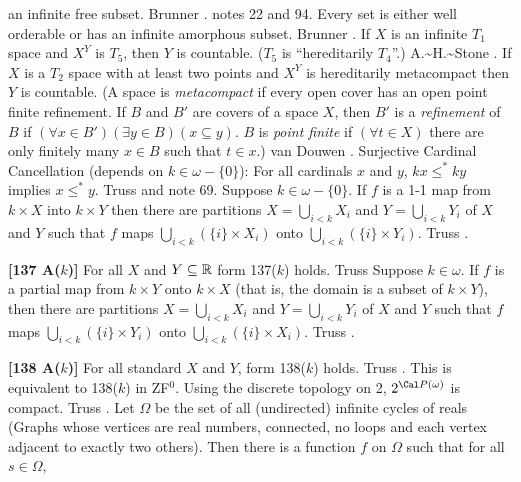 an infinite free subset.  \ac{Brunner} \cite{1989}. notes 22 and 94.
\medskip
{} Every set is either well orderable or has an
infinite amorphous subset.  \ac{Brunner} \cite{1982a}.
\medskip
{} If $X$ is an infinite $T_1$ space and $X^{Y}$
is $T_5$, then $Y$ is countable. ($T_5$ is ``hereditarily $T_4$''.)
\ac{A.~H.~Stone} \cite{1948}.
\medskip
{} If $X$ is a $T_2$ space with at least two points
and $X^{Y}$ is hereditarily metacompact then $Y$ is  countable. (A space
is {\it metacompact} if every open cover has an open point finite
refinement. If $B$ and $B'$ are covers of a space $X$, then $B'$ is a {\it
refinement} of $B$ if $(\forall x\in B')(\exists y\in B)(x\subseteq y)$.
$B$ is {\it point finite} if $(\forall t\in X)$ there are only finitely
many $x\in B$ such that $t\in x$.) van \ac{Douwen} \cite{1980}.
\medskip
{} Surjective Cardinal Cancellation (depends on
$k\in\omega-\{0\}$): For all cardinals $x$ and $y$, $kx\le^* ky$ implies
$x\le^* y$. \ac{Truss} \cite{1984} and note 69.
\medskip
{} Suppose $k\in\omega-\{0\}$. If $f$ is a 1-1
map from $k\times X$ into $k\times Y$ then there are partitions $X =
\bigcup^{}_{i<k} X_{i}$ and $Y = \bigcup^{}_{i<k} Y_{i}$ of $X$ and $Y$
such that $f$ maps $\bigcup^{}_{i<k} (\{i\} \times  X_{i})$ onto
$\bigcup^{}_{i<k} (\{i\} \times  Y_{i})$.  \ac{Truss} \cite{1984}.
\smallskip
\item{}{\bf [137 A($k$)]} For all $X$ and $Y\subseteq{\Bbb R}$ form
137($k$) holds.  \ac{Truss} \cite{1984}
\medskip
{} Suppose $k\in\omega$.  If $f$ is a
partial map from $k\times Y$  onto $k\times X$ (that is, the domain
is a subset of $k\times Y$), then there are partitions $X =
\bigcup^{}_{i<k} X_{i}$  and $Y = \bigcup^{}_{i<k} Y_{i}$ of $X$ and $Y$
such that $f$ maps $\bigcup^{}_{i<k} (\{i\} \times Y_{i})$ onto
$\bigcup^{}_{i<k} (\{i\} \times X_{i})$.  \ac{Truss} \cite{1984}.
\smallskip
\item{}{\bf [138 A($k$)]} For all standard $X$ and $Y$, form 138($k$)
holds. \ac{Truss} \cite{1984}. This is equivalent to 138($k$) in ZF$^0$.
\medskip
{} Using the discrete topology on 2,
$2^{\Cal P(\omega)}$ is compact. \ac{Truss} \cite{1984}.
\medskip
{} Let $\Omega$ be the set of all (undirected)
infinite cycles of reals (Graphs whose vertices are real numbers,
connected, no loops and each vertex adjacent to  exactly two others). Then
there is a function $f$ on $\Omega $ such that for all $s\in\Omega$,
